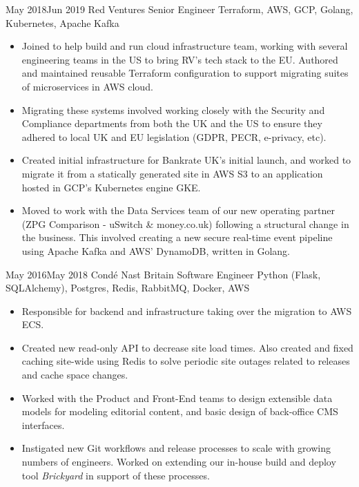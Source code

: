 \documentclass[10pt]{article} %
\begin{document}
\jobheader
{May 2018}{Jun 2019}
{Red Ventures}
{Senior Engineer}
{
      Terraform,
      AWS,
      GCP,
      Golang,
      Kubernetes,
      Apache Kafka
}
{
      \begin{itemize}

      \item Joined to help build and run cloud infrastructure team, working
            with several engineering teams in the US to bring RV's tech stack to the EU.
            Authored and maintained reusable Terraform configuration to support migrating
            suites of microservices in AWS cloud.

      \item Migrating these systems involved working closely with the Security
            and Compliance departments from both the UK and the US to ensure they
            adhered to local UK and EU legislation (GDPR, PECR, e-privacy, etc).

      \item Created initial infrastructure for Bankrate UK's initial launch, and worked
            to migrate it from a statically generated site in AWS S3 to an application hosted
            in GCP's Kubernetes engine GKE.

      \item Moved to work with the Data Services team of our new operating partner
            (ZPG Comparison - uSwitch \& money.co.uk) following a structural change
            in the business. This involved creating a new secure real-time event
            pipeline using Apache Kafka and AWS' DynamoDB, written in Golang.

  \end{itemize}

}
\jobheader
{May 2016}{May 2018}
{Condé Nast Britain}
{Software Engineer}
{
      Python (Flask, SQLAlchemy),
      Postgres,
      Redis,
      RabbitMQ,
      Docker,
      AWS
}
{
  \begin{itemize}

      \item Responsible for backend and infrastructure taking over the migration to AWS ECS.

      \item Created new read-only API to decrease site load times. Also created and fixed
            caching site-wide using Redis to solve periodic site outages related to
            releases and cache space changes.

      \item Worked with the Product and Front-End teams to design extensible data models
            for modeling editorial content, and basic design of back-office CMS
            interfaces.

      \item Instigated new Git workflows and release processes to scale with growing
            numbers of engineers. Worked on extending our in-house build and deploy
            tool \textit{Brickyard} in support of these processes.

  \end{itemize}

}
\end{document}
